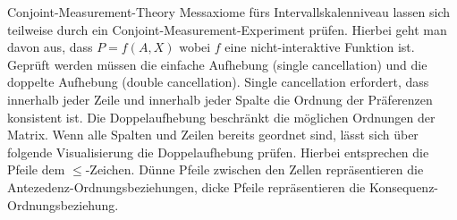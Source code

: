 \begin{formulaBox}{Conjoint-Measurement-Theory}{}
  Messaxiome fürs Intervallskalenniveau lassen sich teilweise durch ein Conjoint-Measurement-Experiment prüfen. Hierbei geht man davon aus, dass $P=f(A,X)$ wobei $f$ eine nicht-interaktive Funktion ist. Geprüft werden müssen die einfache Aufhebung (single cancellation) und die doppelte Aufhebung (double cancellation). Single cancellation erfordert, dass innerhalb jeder Zeile und innerhalb jeder Spalte die Ordnung der Präferenzen konsistent ist. Die Doppelaufhebung beschränkt die möglichen Ordnungen der Matrix. Wenn alle Spalten und Zeilen bereits geordnet sind, lässt sich über folgende Visualisierung die Doppelaufhebung prüfen. Hierbei entsprechen die Pfeile dem $\leq$-Zeichen. Dünne Pfeile zwischen den Zellen repräsentieren die Antezedenz-Ordnungsbeziehungen, dicke Pfeile repräsentieren die Konsequenz-Ordnungsbeziehung.
  



\end{formulaBox}
